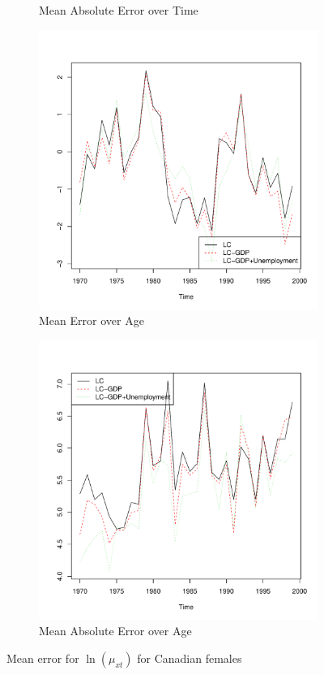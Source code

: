 \documentclass[AER, draftmode]{AEA}
\begin{document}
\begin{figure}[!htp]
\begin{subfigure}{0.4\textwidth}
		\caption{Mean Absolute Error over Time}
	\end{subfigure}
	\begin{subfigure}{0.4\textwidth}
		\includegraphics[width=\linewidth]{CAN_error_time_female} 
		\caption{Mean Error over Age}
	\end{subfigure}
	\begin{subfigure}{0.4\textwidth}
		\includegraphics[width=\linewidth]{CAN_abs_error_time_female} 
		\caption{Mean Absolute Error over Age}
	\end{subfigure}
	\caption{Mean error for $\ln(\mu_{xt})$ for Canadian females}
\end{figure}
\end{document}
